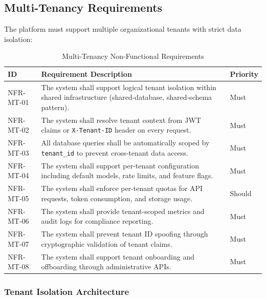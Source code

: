 \documentclass[a4paper,twoside]{sapthesis}
\begin{document}
\subsection{Multi-Tenancy Requirements}
\label{subsec:nfr-multitenancy}

The platform must support multiple organizational tenants with strict data isolation:

\begin{table}[htbp]
\centering
\caption{Multi-Tenancy Non-Functional Requirements}
\label{tab:nfr-multitenancy}
\small
\begin{tabularx}{\textwidth}{|l|X|l|}
\hline
\textbf{ID} & \textbf{Requirement Description} & \textbf{Priority} \\
\midrule
NFR-MT-01 & The system shall support logical tenant isolation within shared infrastructure (shared-database, shared-schema pattern). & Must \\
\midrule
NFR-MT-02 & The system shall resolve tenant context from JWT claims or \texttt{X-Tenant-ID} header on every request. & Must \\
\midrule
NFR-MT-03 & All database queries shall be automatically scoped by \texttt{tenant\_id} to prevent cross-tenant data access. & Must \\
\midrule
NFR-MT-04 & The system shall support per-tenant configuration including default models, rate limits, and feature flags. & Must \\
\midrule
NFR-MT-05 & The system shall enforce per-tenant quotas for API requests, token consumption, and storage usage. & Should \\
\midrule
NFR-MT-06 & The system shall provide tenant-scoped metrics and audit logs for compliance reporting. & Must \\
\midrule
NFR-MT-07 & The system shall prevent tenant ID spoofing through cryptographic validation of tenant claims. & Must \\
\midrule
NFR-MT-08 & The system shall support tenant onboarding and offboarding through administrative APIs. & Must \\
\midrule
\end{tabularx}
\end{table}

\subsubsection{Tenant Isolation Architecture}
\end{document}
